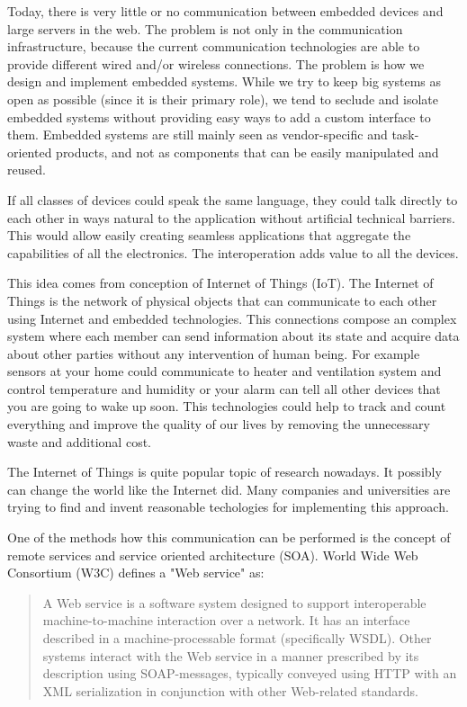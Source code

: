 Today, there is very little or no communication between embedded devices and large servers in the web.
The problem is not only in the communication infrastructure, because the current communication technologies are able to provide different wired and/or wireless connections.
The problem is how we design and implement embedded systems. While we
try to keep big systems as open as possible (since it is their primary role), we tend to seclude and isolate embedded systems without providing easy ways to add a
custom interface to them. Embedded systems are still mainly seen as vendor-specific and task-oriented products, and not as components that can be easily manipulated and reused.

If all classes of devices could speak the same language, they could 
talk directly to each other in ways natural to the application without artificial technical barriers. This would allow easily 
creating seamless applications that aggregate the capabilities of all 
the electronics. The interoperation adds value to all the devices.

This idea comes from conception of Internet of Things (IoT). The Internet of
Things is the network of physical objects that can communicate to each other
using Internet and embedded technologies. This
connections compose an complex system where each member can send information
about its state and acquire data about other parties without any intervention of
human being.
For example sensors at your home could communicate to heater
and ventilation system and control temperature and humidity or your alarm can
tell all other devices that you are going to wake up soon. 
This technologies could help to track and count everything and improve the
quality of our lives by removing the unnecessary waste and additional cost.


The Internet of Things is quite popular topic of research nowadays. It possibly
can change the world like the Internet did. Many companies and universities are
trying to find and invent reasonable techologies for implementing this approach.

One of the methods how this communication can be performed is the concept of
remote services and service oriented architecture (SOA).
World Wide Web Consortium (W3C) defines a "Web service" as: 
\begin{quote}
A Web service is a software system designed to support interoperable machine-to-machine interaction over a network.
It has an interface described in a machine-processable format (specifically
\gls{WSDL}).
Other systems interact with the Web service in a manner prescribed by its
description using \gls{SOAP}-messages, typically conveyed using \gls{HTTP} with
an \gls{XML} serialization in conjunction with other Web-related standards.
\end{quote}

